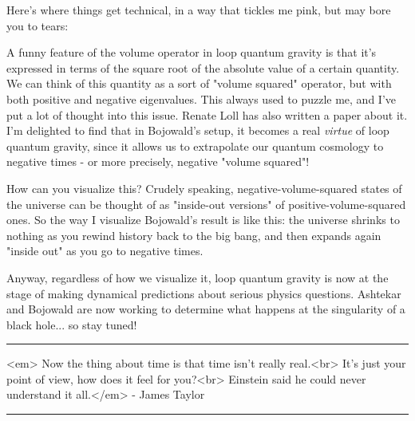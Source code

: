 Here's where things get technical, in a way that tickles me pink, but
may bore you to tears:

A funny feature of the volume operator in loop quantum gravity is that
it's expressed in terms of the square root of the absolute value of a
certain quantity.  We can think of this quantity as a sort of "volume
squared" operator, but with both positive and negative eigenvalues.
This always used to puzzle me, and I've put a lot of thought into this
issue.  Renate Loll has also written a paper about it.  I'm delighted
to find that in Bojowald's setup, it becomes a real \emph{virtue} of loop
quantum gravity, since it allows us to extrapolate our quantum
cosmology to negative times - or more precisely, negative "volume
squared"!

How can you visualize this?  Crudely speaking, negative-volume-squared
states of the universe can be thought of as "inside-out versions" of
positive-volume-squared ones.  So the way I visualize Bojowald's
result is like this: the universe shrinks to nothing as you rewind
history back to the big bang, and then expands again "inside out" as
you go to negative times.

Anyway, regardless of how we visualize it, loop quantum gravity
is now at the stage of making dynamical predictions about serious
physics questions.  Ashtekar and Bojowald are now working to determine
what happens at the singularity of a black hole... so stay tuned!




 \par\noindent\rule{\textwidth}{0.4pt}
<em>
Now the thing about time is that time isn't really real.<br>
It's just your point of view, how does it feel for you?<br>
Einstein said he could never understand it all.</em> - James Taylor


\par\noindent\rule{\textwidth}{0.4pt}

